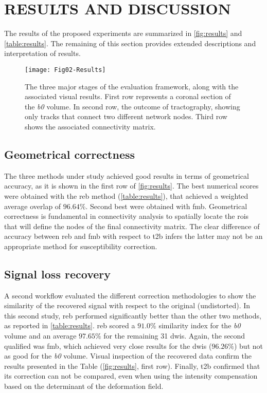 \section{RESULTS AND DISCUSSION}
\label{sec:results}
The results of the proposed experiments are summarized
in \autoref{fig:results} and \autoref{table:results}.
The remaining of this section provides extended descriptions
and interpretation of results.



\begin{figure*}[tpb]
   \centering
   \texttt{[image: Fig02-Results]}
   \caption{The three major stages of the evaluation framework,
   along with the associated visual results. First row represents
   a coronal section of the \textit{b0} volume. In second row, the outcome
   of tractography, showing only tracks that connect two different
   network nodes. Third row shows the associated connectivity matrix. }
   \label{fig:results}
\end{figure*}


\subsection{Geometrical correctness}

The three methods under study achieved good results in
terms of geometrical accuracy, as it is shown in the first
row of \autoref{fig:results}. The best numerical scores
were obtained with the \gls*{reb} method (\autoref{table:results}),
that achieved a weighted average overlap of $96.64\%$. Second
best were obtained with \gls*{fmb}. Geometrical correctness
is fundamental in connectivity analysis to spatially locate the
\glspl*{roi} that will define the nodes of the final connectivity
matrix. The clear difference of accuracy between \gls*{reb} and \gls*{fmb}
with respect to \gls*{t2b} infers the latter may not be
an appropriate method for susceptibility correction.

\subsection{Signal loss recovery}

A second workflow evaluated the different correction 
methodologies to show the similarity of the recovered
signal with respect to the original (undistorted).
In this second study, \gls*{reb} performed significantly
better than the other two methods, as reported
in \autoref{table:results}. \gls*{reb} scored a $91.0\%$
similarity index for the \textit{b0} volume and an average $97.65\%$
for the remaining 31 \glspl*{dwi}. Again, the second
qualified was \gls*{fmb}, which achieved very close results
for the \glspl*{dwi} ($96.26\%$) but not as good for the \textit{b0}
volume. Visual inspection of the recovered data confirm the 
results presented in the Table (\autoref{fig:results}, first
row). Finally, \gls*{t2b} confirmed that its correction
can not be compared, even when using the intensity compensation
based on the determinant of the deformation field.

